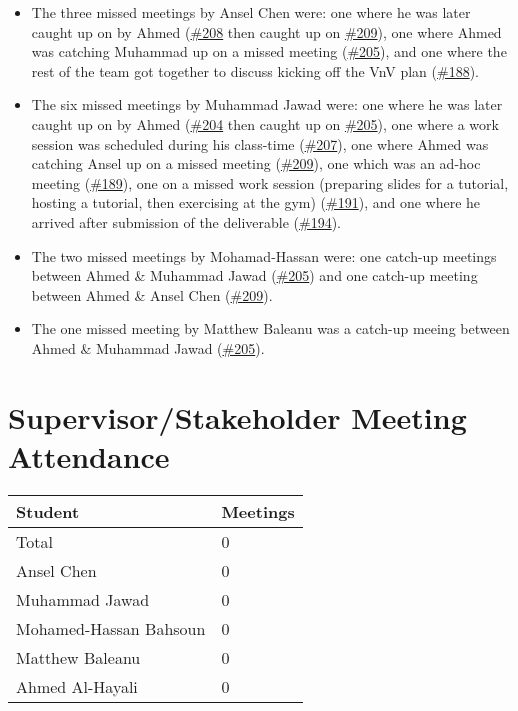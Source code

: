 \documentclass{article}
\begin{document}
\begin{itemize}
    \item The three missed meetings by Ansel Chen were: one where he was later caught up on by Ahmed (\href{https://github.com/AhmedAl-Hayali/GenreGuru/issues/208}{\#208} then caught up on \href{https://github.com/AhmedAl-Hayali/GenreGuru/issues/209}{\#209}), one where Ahmed was catching Muhammad up on a missed meeting (\href{https://github.com/AhmedAl-Hayali/GenreGuru/issues/205}{\#205}), and one where the rest of the team got together to discuss kicking off the VnV plan (\href{https://github.com/AhmedAl-Hayali/GenreGuru/issues/188}{\#188}).
    \item The six missed meetings by Muhammad Jawad were: one where he was later caught up on by Ahmed (\href{https://github.com/AhmedAl-Hayali/GenreGuru/issues/204}{\#204} then caught up on \href{https://github.com/AhmedAl-Hayali/GenreGuru/issues/205}{\#205}), one where a work session was scheduled during his class-time (\href{https://github.com/AhmedAl-Hayali/GenreGuru/issues/207}{\#207}), one where Ahmed was catching Ansel up on a missed meeting (\href{https://github.com/AhmedAl-Hayali/GenreGuru/issues/209}{\#209}), one which was an ad-hoc meeting (\href{https://github.com/AhmedAl-Hayali/GenreGuru/issues/189}{\#189}), one on a missed work session (preparing slides for a tutorial, hosting a tutorial, then exercising at the gym) (\href{https://github.com/AhmedAl-Hayali/GenreGuru/issues/191}{\#191}), and one where he arrived after submission of the deliverable (\href{https://github.com/AhmedAl-Hayali/GenreGuru/issues/194}{\#194}).
    \item The two missed meetings by Mohamad-Hassan were: one catch-up meetings between Ahmed \& Muhammad Jawad (\href{https://github.com/AhmedAl-Hayali/GenreGuru/issues/205}{\#205}) and one catch-up meeting between Ahmed \& Ansel Chen (\href{https://github.com/AhmedAl-Hayali/GenreGuru/issues/209}{\#209}).
    \item The one missed meeting by Matthew Baleanu was a catch-up meeing between Ahmed \& Muhammad Jawad (\href{https://github.com/AhmedAl-Hayali/GenreGuru/issues/205}{\#205}).
\end{itemize}

\newpage
\section{Supervisor/Stakeholder Meeting Attendance}

\begin{table}[H]
\centering
\begin{tabular}{ll}
\toprule
\textbf{Student} & \textbf{Meetings}\\
\midrule
Total & 0\\
Ansel Chen & 0\\
Muhammad Jawad & 0\\
Mohamed-Hassan Bahsoun & 0\\
Matthew Baleanu & 0\\
Ahmed Al-Hayali & 0\\
\bottomrule
\end{tabular}
\end{table}
\end{document}
